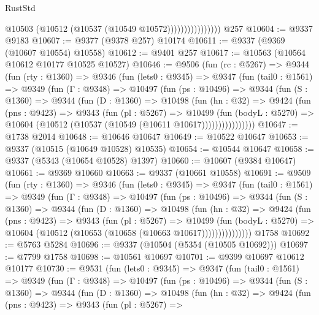 \begin{lexlean}{RustStd}
\begin{coremodule}
                            @10503 (@10512 (@10537 (@10549 @10572))))))))))))))))
    @257
@10604 := @9337 @9183
@10607 := @9377 (@9378 @257) @10174
@10611 := @9337 (@9369 (@10607 @10554) @10558)
@10612 := @9401 @257
@10617 := @10563 (@10564 @10612 @10177 @10525 @10527)
@10646 := @9506
    (fun (rc : @5267) =>
    @9344
      (fun (rty : @1360) =>
      @9346
        (fun (lets0 : @9345) =>
        @9347
          (fun (tail0 : @1561) =>
          @9349
            (fun (Γ : @9348) =>
            @10497
              (fun (ps : @10496) =>
              @9344
                (fun (S : @1360) =>
                @9344
                  (fun (D : @1360) =>
                  @10498
                    (fun (hn : @32) =>
                    @9424
                      (fun (pns : @9423) =>
                      @9343
                        (fun (pl : @5267) =>
                        @10499
                          (fun (bodyL : @5270) =>
                          @10604 (@10512 (@10537 (@10549 (@10611 @10617))))))))))))))))
@10647 := @1738 @2014
@10648 := @10646 @10647
@10649 := @10522 @10647
@10653 := @9337 (@10515 (@10649 @10528) @10535)
@10654 := @10544 @10647
@10658 := @9337 (@5343 (@10654 @10528) @1397)
@10660 := @10607 (@9384 @10647)
@10661 := @9369 @10660
@10663 := @9337 (@10661 @10558)
@10691 := @9509
    (fun (rty : @1360) =>
    @9346
      (fun (lets0 : @9345) =>
      @9347
        (fun (tail0 : @1561) =>
        @9349
          (fun (Γ : @9348) =>
          @10497
            (fun (ps : @10496) =>
            @9344
              (fun (S : @1360) =>
              @9344
                (fun (D : @1360) =>
                @10498
                  (fun (hn : @32) =>
                  @9424
                    (fun (pns : @9423) =>
                    @9343
                      (fun (pl : @5267) =>
                      @10499
                        (fun (bodyL : @5270) =>
                        @10604 (@10512 (@10653 (@10658 (@10663 @10617)))))))))))))))
    @1758
@10692 := @5763 @5284
@10696 := @9337 (@10504 (@5354 (@10505 @10692)))
@10697 := @7799 @1758
@10698 := @10561 @10697
@10701 := @9399 @10697 @10612 @10177
@10730 := @9531
    (fun (lets0 : @9345) =>
    @9347
      (fun (tail0 : @1561) =>
      @9349
        (fun (Γ : @9348) =>
        @10497
          (fun (ps : @10496) =>
          @9344
            (fun (S : @1360) =>
            @9344
              (fun (D : @1360) =>
              @10498
                (fun (hn : @32) =>
                @9424
                  (fun (pns : @9423) =>
                  @9343
                    (fun (pl : @5267) =>

\end{coremodule}
\end{lexlean}
